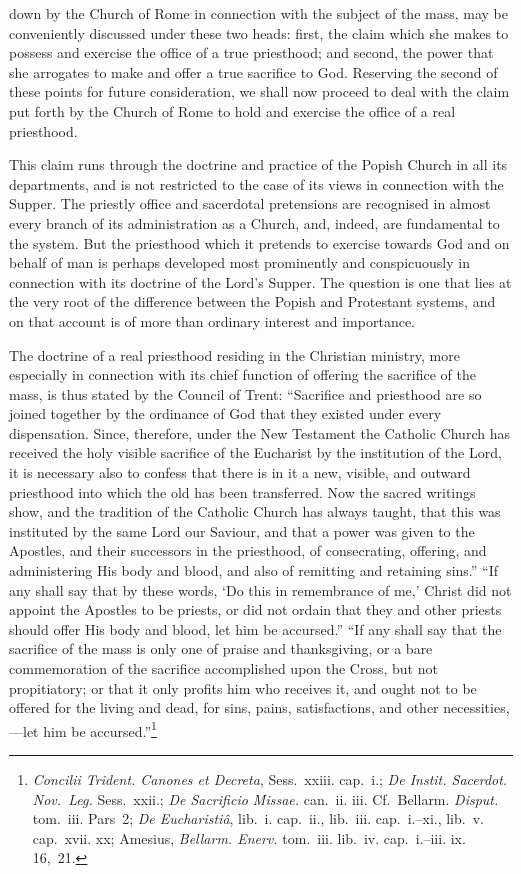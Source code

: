 \documentclass[
]{book}
\begin{document}
down by the Church of Rome in connection with the subject of the mass, may be conveniently discussed under these two heads: first, the claim which she makes to possess and exercise the office of a true priesthood; and second, the power that she arrogates to make and offer a true sacrifice to God. Reserving the second of these points for future consideration, we shall now proceed to deal with the claim put forth by the Church of Rome to hold and exercise the office of a real priesthood.

This claim runs through the doctrine and practice of the Popish Church in all its departments, and is not restricted to the case of its views in connection with the Supper. The priestly office and sacerdotal pretensions are recognised in almost every branch of its administration as a Church, and, indeed, are fundamental to the system. But the priesthood which it pretends to exercise towards God and on behalf of man is perhaps developed most prominently and conspicuously in connection with its doctrine of the Lord's Supper. The question is one that lies at the very root of the difference between the Popish and Protestant systems, and on that account is of more than ordinary interest and importance.

The doctrine of a real priesthood residing in the Christian ministry, more especially in connection with its chief function of offering the sacrifice of the mass, is thus stated by the Council of Trent: ``Sacrifice and priesthood are so joined together by the ordinance of God that they existed under every dispensation. Since, therefore, under the New Testament the Catholic Church has received the holy visible sacrifice of the Eucharist by the institution of the Lord, it is necessary also to confess that there is in it a new, visible, and outward priesthood into which the old has been transferred. Now the sacred writings show, and the tradition of the Catholic Church has always taught, that this was instituted by the same Lord our Saviour, and that a power was given to the Apostles, and their successors in the priesthood, of consecrating, offering, and administering His body and blood, and also of remitting and retaining sins.'' ``If any shall say that by these words, `Do this in remembrance of me,' Christ did not appoint the Apostles to be priests, or did not ordain that they and other priests should offer His body and blood, let him be accursed.'' ``If any shall say that the sacrifice of the mass is only one of praise and thanksgiving, or a bare commemoration of the sacrifice accomplished upon the Cross, but not propitiatory; or that it only profits him who receives it, and ought not to be offered for the living and dead, for sins, pains, satisfactions, and other necessities,---let him be accursed.''\footnote{\foreignlanguage{latin}{\emph{Concilii Trident. Canones et Decreta}}, Sess.~xxiii. cap.~i.; \foreignlanguage{latin}{\emph{De Instit. Sacerdot. Nov.~Leg.}} Sess.~xxii.; \foreignlanguage{latin}{\emph{De Sacrificio Missae.}} can.~ii. iii. Cf.~Bellarm. \emph{Disput.} tom.~iii. Pars~2; \foreignlanguage{latin}{\emph{De Eucharistiâ}}, lib.~i. cap.~ii., lib.~iii. cap.~i.--xi., lib.~v. cap.~xvii. xx; Amesius, \emph{Bellarm. Enerv.} tom.~iii. lib.~iv. cap.~i.--iii. ix. 16,~21.}
\end{document}
